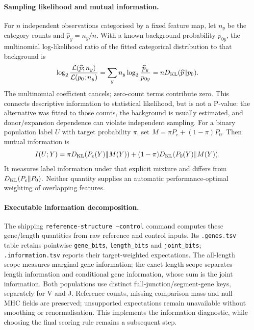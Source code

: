 \documentclass[10pt,a4paper]{article}
\theoremstyle{definition}
\begin{document}
\paragraph{Sampling likelihood and mutual information.}
For $n$ independent observations categorised by a fixed feature map, let $n_y$ be the category counts and $\widehat p_y=n_y/n$.
With a known background probability $p_{0y}$, the multinomial log-likelihood ratio of the fitted categorical distribution to that background is
\[
 \log_2\frac{\mathcal L(\widehat p;n_y)}{\mathcal L(p_0;n_y)}
 =\sum_y n_y\log_2\frac{\widehat p_y}{p_{0y}}
 =nD_{\rm KL}(\widehat p\Vert p_0).
\]
The multinomial coefficient cancels; zero-count terms contribute zero.
This connects descriptive information to statistical likelihood, but is not a P-value: the alternative was fitted to those counts, the background is usually estimated, and donor/expansion dependence can violate independent sampling.
For a binary population label $U$ with target probability $\pi$, set $M=\pi P_e+(1-\pi)P_0$.
Then mutual information is
\[
 I(U;Y)=\pi D_{\rm KL}(P_e(Y)\Vert M(Y))
       +(1-\pi)D_{\rm KL}(P_0(Y)\Vert M(Y)).
\]
It measures label information under that explicit mixture and differs from $D_{\rm KL}(P_e\Vert P_0)$.
Neither quantity supplies an automatic performance-optimal weighting of overlapping features.

\paragraph{Executable information decomposition.}
The shipping \texttt{reference-structure --control} command computes these gene/length quantities from raw reference and control inputs.
Its \texttt{.genes.tsv} table retains pointwise \texttt{gene\_bits}, \texttt{length\_bits} and \texttt{joint\_bits}; \texttt{.information.tsv} reports their target-weighted expectations.
The all-length scope measures marginal gene information; the exact-length scope separates length information and conditional gene information, whose sum is the joint information.
Both populations use distinct full-junction/segment-gene keys, separately for V and J.
Reference counts, missing comparison mass and null MHC fields are preserved; unsupported expectations remain unavailable without smoothing or renormalisation.
This implements the information diagnostic, while choosing the final scoring rule remains a subsequent step.
\end{document}
